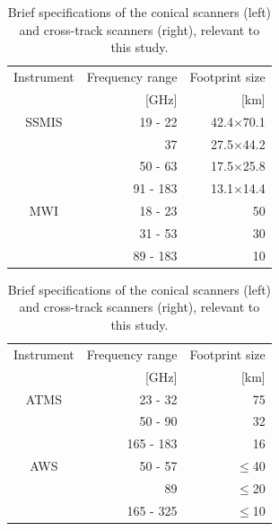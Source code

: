 \documentclass[12pt,oneside,a4paper]{article}
\begin{document}
\begin{table}[!t]
	\footnotesize
	\centering
	\caption{Brief specifications of the conical scanners (left) and cross-track scanners (right), relevant to this study.}
	\label{tab:specifications_instruments}	
	\parbox{.45\linewidth}{
	\centering
	\begin{tabular}{crr}
	\toprule
		Instrument & Frequency range 	& Footprint size \\
					& [GHz]             & [km]     \\
		\midrule			
		SSMIS	   &19 - 22		& 42.4$\times$70.1	\\
				   &37          &27.5$\times$44.2  \\
				   &50 - 63       & 17.5$\times$25.8 \\
				   &91 - 183    &  13.1$\times$14.4\\
		\midrule
		MWI 	   &18 - 23 		&50\\
				   &31 - 53 		& 30\\
				   & 89 - 183 	& 10\\	
		\bottomrule		
	\end{tabular}
	}
\hfill
\parbox{.45\linewidth}{
	\centering
	\begin{tabular}{crr}
	\toprule
	Instrument & Frequency range 	& Footprint size \\
	& [GHz]             & [km]       \\
	\midrule			
	ATMS	    &23 - 32		& 75	\\
				&50 - 90        &32  \\
				&165 - 183        & 16 \\
	\midrule
	AWS 	   &50 - 57 		& $\le$40\\
			   &89 				& $\le$20\\
			   & 165 - 325 		& $\le$10\\	
	\bottomrule		
\end{tabular}
}
\end{table}
\end{document}

